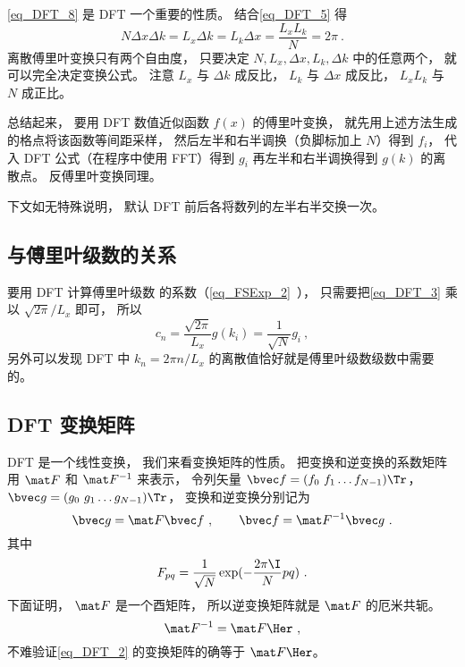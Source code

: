 \autoref{eq_DFT_8} 是 DFT 一个重要的性质。 结合\autoref{eq_DFT_5} 得
\begin{equation}\label{eq_DFT_9}
N\Delta x \Delta k = L_x \Delta k = L_k \Delta x = \frac{L_x L_k}{N} = 2\pi~.
\end{equation}
离散傅里叶变换只有两个自由度， 只要决定 $N, L_x, \Delta x, L_k, \Delta k$ 中的任意两个， 就可以完全决定变换公式。 注意 $L_x$ 与 $\Delta k$ 成反比， $L_k$ 与 $\Delta x$ 成反比， $L_xL_k$ 与 $N$ 成正比。

总结起来， 要用 DFT 数值近似函数 $f(x)$ 的傅里叶变换， 就先用上述方法生成的格点将该函数等间距采样， 然后左半和右半调换（负脚标加上 $N$）得到 $f_i$， 代入 DFT 公式（在程序中使用 FFT）得到 $g_i$ 再左半和右半调换得到 $g(k)$ 的离散点。 反傅里叶变换同理。

下文如无特殊说明， 默认 DFT 前后各将数列的左半右半交换一次。

\subsection{与傅里叶级数的关系}
要用 DFT 计算傅里叶级数 的系数（\autoref{eq_FSExp_2}~）， 只需要把\autoref{eq_DFT_3} 乘以 $\sqrt{2\pi}/L_x$ 即可， 所以
\begin{equation}\label{eq_DFT_10}
c_n = \frac{\sqrt{2\pi}}{L_x} g(k_i) = \frac{1}{\sqrt{N}} g_i~,
\end{equation}
另外可以发现 DFT 中 $k_n = 2\pi n/L_x$ 的离散值恰好就是傅里叶级数级数中需要的。

\subsection{DFT 变换矩阵}
DFT 是一个线性变换， 我们来看变换矩阵的性质。 把变换和逆变换的系数矩阵用
 $\mat F$ 和 $\mat F^{-1}$ 来表示， 令列矢量 $\bvec f = (f_0\ f_1\dots f_{N-1})\Tr$， $\bvec g = (g_0\ g_1\dots g_{N-1})\Tr$， 变换和逆变换分别记为
\begin{equation}
\bvec g = \mat F \bvec f ~,\qquad
\bvec f = \mat F^{-1} \bvec g~.
\end{equation}
其中
\begin{equation}
F_{pq} = \frac{1}{\sqrt{N}} \exp(-\frac{2\pi\I}{N} p q)~.
\end{equation}
下面证明， $\mat F$ 是一个酉矩阵， 所以逆变换矩阵就是 $\mat F$ 的厄米共轭。
\begin{equation}
\mat F^{-1} = \mat F\Her~,
\end{equation}
不难验证\autoref{eq_DFT_2} 的变换矩阵的确等于 $\mat F\Her$。

